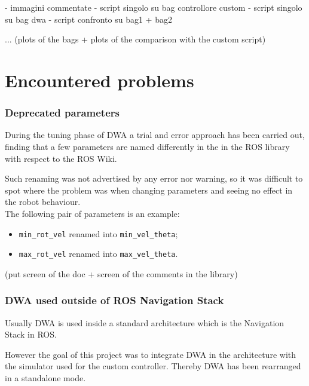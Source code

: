 \documentclass[11pt,a4paper]{article}
\begin{document}
- immagini commentate
    - script singolo su bag controllore custom
    - script singolo su bag dwa
    - script confronto su bag1 + bag2




... (plots of the bags + plots of the comparison with the custom script)




\section{Encountered problems}

\subsubsection{Deprecated parameters}

During the tuning phase of DWA a trial and error approach has been carried out, finding that
a few parameters are named differently in the in the ROS library with respect to the ROS Wiki.

Such renaming was not advertised by any error nor warning, so it was difficult to spot where the problem
was when changing parameters and seeing no effect in the robot behaviour.\\

The following pair of parameters is an example:
\begin{itemize}
 \item \texttt{min\_rot\_vel} renamed into \texttt{min\_vel\_theta};
 \item \texttt{max\_rot\_vel} renamed into \texttt{max\_vel\_theta}.\\
\end{itemize}

(put screen of the doc + screen of the comments in the library)

\subsubsection{DWA used outside of ROS Navigation Stack}

Usually DWA is used inside a standard architecture which is the Navigation Stack in ROS.

However the goal of this project was to integrate DWA in the architecture with the simulator used for
the custom controller. Thereby DWA has been rearranged in a standalone mode.\\
\end{document}
